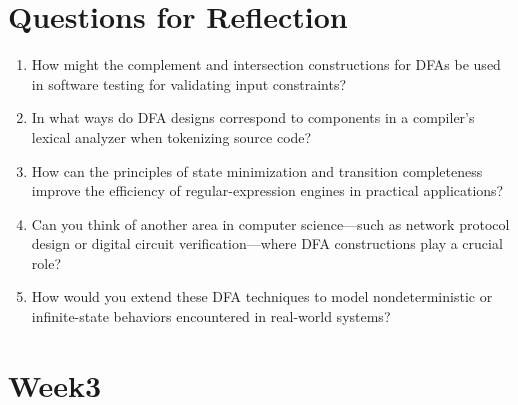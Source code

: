 \documentclass{article}
\begin{document}
\section*{Questions for Reflection}
\begin{enumerate}
  \item How might the complement and intersection constructions for DFAs be used in software testing for validating input constraints?  
  \item In what ways do DFA designs correspond to components in a compiler’s lexical analyzer when tokenizing source code?  
  \item How can the principles of state minimization and transition completeness improve the efficiency of regular-expression engines in practical applications?  
  \item Can you think of another area in computer science—such as network protocol design or digital circuit verification—where DFA constructions play a crucial role?  
  \item How would you extend these DFA techniques to model nondeterministic or infinite-state behaviors encountered in real-world systems?  
\end{enumerate}
\section{Week3}
\end{document}
